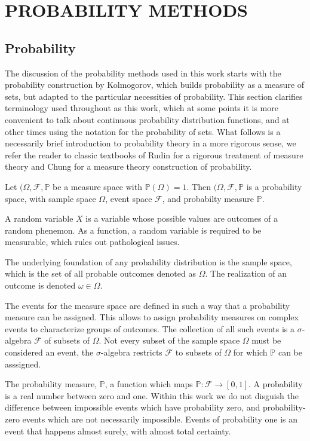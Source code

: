 \chapter{PROBABILITY METHODS}
\label{chapter:probability_methods}

\section{Probability}

The discussion of the probability methods used in this work starts with the probability construction by Kolmogorov, which builds probability as a measure of sets, but adapted to the particular necessities of probability.
This section clarifies terminology used throughout as this work, which at some points it is more convenient to talk about continuous probability distribution functions, and at other times using the notation for the probability of sets.
What follows is a necessarily brief introduction to probability theory in a more rigorous sense, we refer the reader to classic textbooks of Rudin\cite{rudin1987_realanalysis} for a rigorous treatment of measure theory and Chung\cite{chung2001_probabilitytheory} for a measure theory construction of probability.

Let $(\Omega,\mathcal{F},\mathbb{P}$ be a measure space with $\mathbb{P}(\Omega)=1$.  
Then $(\Omega,\mathcal{F},\mathbb{P}$ is a probability space, with sample space $\Omega$, event space $\mathcal{F}$, and probabilty measure $\mathbb{P}$.

A random variable $X$ is a variable whose possible values are outcomes of a random phenemon.  As a function, a random variable is required to be measurable, which rules out pathological issues.

The underlying foundation of any probability  distribution is the sample space, which is the set of all probable outcomes denoted as $\Omega$.  The realization of an outcome is denoted $\omega \in \Omega$.

The events for the measure space are defined in such a way that a probability measure can be assigned.  This allows to assign probability measures on complex events to characterize groups of outcomes.  The collection of all such events is a $\sigma$-algebra $\mathcal{F}$ of subsets of $\Omega$.  Not every subset of the sample space $\Omega$ must be considered an event, the $\sigma$-algebra restricts $\mathcal{F}$ to subsets of $\Omega$ for which $\mathbb{P}$ can be asssigned.

The probability measure, $\mathbb{P}$, a function which maps $\mathbb{P}:\mathcal{F}\rightarrow[0,1]$.  A probability is a real number between zero and one.  Within this work we do not disguish the difference between impossible events which have probability zero, and probability-zero events which are not necessarily impossible.  Events of probability one is an event that happens almost surely, with almost total certainty.

